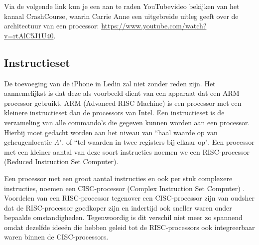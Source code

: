 Via de volgende link kun je een aan te raden YouTubevideo bekijken van het kanaal CrashCourse, waarin Carrie Anne een uitgebreide uitleg geeft over de architectuur van een processor: {\color{blue} \url{https://www.youtube.com/watch?v=rtAlC5J1U40}}.

\subsection{Instructieset}
De toevoeging van de iPhone in Ledin zal niet zonder reden zijn. Het aannemelijkst is dat deze als voorbeeld dient van een apparaat dat een ARM processor gebruikt. ARM (Advanced RISC Machine) is een processor met een kleinere instructieset dan de processors van Intel. Een instructieset is de verzameling van alle commando's die gegeven kunnen worden aan een processor. Hierbij moet gedacht worden aan het niveau van ``haal waarde op van geheugenlocatie \textit{A}", of ``tel waarden in twee registers bij elkaar op". Een processor met een kleiner aantal van deze soort instructies noemen we een RISC-processor (Reduced Instruction Set Computer). 

Een processor met een groot aantal instructies en ook per stuk complexere instructies, noemen een CISC-processor (Complex Instruction Set Computer) \cite{tanenbaum}. Voordelen van een RISC-processor tegenover een CISC-processor zijn van oudsher dat de RISC-processor goedkoper zijn en indertijd ook sneller waren onder bepaalde omstandigheden. Tegenwoordig is dit verschil niet meer zo spannend omdat dezelfde ideeën die hebben geleid tot de RISC-processors ook integreerbaar waren binnen de CISC-processors.




